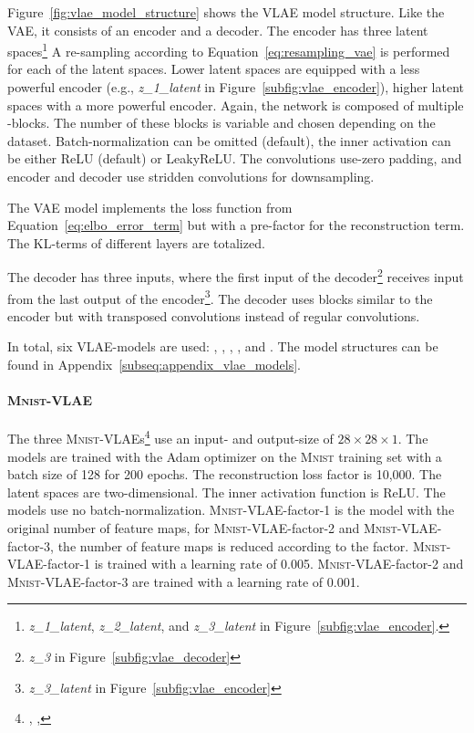 Figure~\ref{fig:vlae_model_structure} shows the \ac{VLAE} model structure.
Like the \ac{VAE}, it consists of an encoder and a decoder.
The encoder has three latent spaces\footnote{\textit{z\_1\_latent}, \textit{z\_2\_latent}, and \textit{z\_3\_latent} in Figure~\ref{subfig:vlae_encoder}.}
A re-sampling according to Equation~\ref{eq:resampling_vae} is performed for each of the latent spaces.
Lower latent spaces are equipped with a less powerful encoder (e.g., \textit{z\_1\_latent} in Figure~\ref{subfig:vlae_encoder}), higher latent spaces with a more powerful encoder.
Again, the network is composed of multiple -blocks.
The number of these blocks is variable and chosen depending on the dataset.
Batch-normalization can be omitted (default), the inner activation can be either ReLU (default) or LeakyReLU.
The convolutions use-zero padding, and encoder and decoder use stridden convolutions for downsampling.

The \ac{VAE} model implements the loss function from Equation~\ref{eq:elbo_error_term} but with a pre-factor for the reconstruction term.
The \ac{KL}-terms of different layers are totalized.

The decoder has three inputs, where the first input of the decoder\footnote{\textit{z\_3} in Figure~\ref{subfig:vlae_decoder}} receives input from the last output of the encoder\footnote{\textit{z\_3\_latent} in Figure~\ref{subfig:vlae_encoder}}.
The decoder uses blocks similar to the encoder but with transposed convolutions instead of regular convolutions.

In total, six \ac{VLAE}-models are used: , ,  , , and .
The model structures can be found in Appendix~\ref{subseq:appendix_vlae_models}.

\paragraph{\textsc{Mnist}-VLAE} The three \textsc{Mnist}-\ac{VLAE}s\footnote{, , } use an input- and output-size of $28\times 28\times 1$.
The models are trained with the Adam optimizer on the \textsc{Mnist} training set with a batch size of 128 for 200 epochs.
The reconstruction loss factor is 10,000.
The latent spaces are two-dimensional.
The inner activation function is ReLU.
The models use no batch-normalization.
\textsc{Mnist}-\ac{VLAE}-factor-1 is the model with the original number of feature maps, for \textsc{Mnist}-\ac{VLAE}-factor-2 and \textsc{Mnist}-\ac{VLAE}-factor-3, the number of feature maps is reduced according to the factor.
\textsc{Mnist}-\ac{VLAE}-factor-1 is trained with a learning rate of 0.005.
\textsc{Mnist}-\ac{VLAE}-factor-2 and \textsc{Mnist}-\ac{VLAE}-factor-3 are trained with a learning rate of 0.001.

